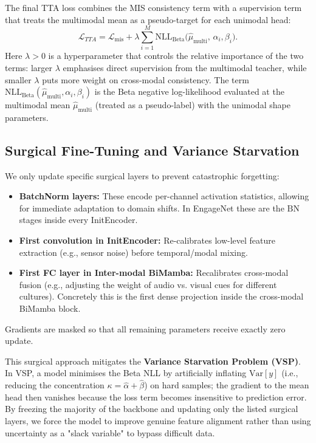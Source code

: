 \documentclass[11pt,a4paper]{article}
\begin{document}
	The final TTA loss combines the MIS consistency term with a supervision term that treats the multimodal mean as a pseudo-target for each unimodal head:
	$$
	\mathcal{L}_{TTA} = \mathcal{L}_{\text{mis}} + \lambda \sum_{i=1}^M \text{NLL}_{\text{Beta}}\bigl(\hat{\mu}_{\text{multi}},\, \alpha_i, \beta_i\bigr).
	$$
	Here $\lambda > 0$ is a hyperparameter that controls the relative importance of the two terms: larger $\lambda$ emphasises direct supervision from the multimodal teacher, while smaller $\lambda$ puts more weight on cross-modal consistency. The term $\text{NLL}_{\text{Beta}}(\hat{\mu}_{\text{multi}}, \alpha_i, \beta_i)$ is the Beta negative log-likelihood evaluated at the multimodal mean $\hat{\mu}_{\text{multi}}$ (treated as a pseudo-label) with the unimodal shape parameters.
	
	\subsection{Surgical Fine-Tuning and Variance Starvation}
	
	We only update specific surgical layers to prevent catastrophic forgetting:
	\begin{itemize}
		\item \textbf{BatchNorm layers:} These encode per-channel activation statistics, allowing for immediate adaptation to domain shifts. In EngageNet these are the $\text{BN}$ stages inside every InitEncoder.
		\item \textbf{First convolution in InitEncoder:} Re-calibrates low-level feature extraction (e.g., sensor noise) before temporal/modal mixing.
		\item \textbf{First FC layer in Inter-modal BiMamba:} Recalibrates cross-modal fusion (e.g., adjusting the weight of audio vs. visual cues for different cultures). Concretely this is the first dense projection inside the cross-modal BiMamba block.
	\end{itemize}
	Gradients are masked so that all remaining parameters receive exactly zero update.
	
	This surgical approach mitigates the \textbf{Variance Starvation Problem (VSP)}. In VSP, a model minimises the Beta NLL by artificially inflating $\mathrm{Var}[y]$ (i.e., reducing the concentration $\kappa = \hat{\alpha}+\hat{\beta}$) on hard samples; the gradient to the mean head then vanishes because the loss term becomes insensitive to prediction error. By freezing the majority of the backbone and updating only the listed surgical layers, we force the model to improve genuine feature alignment rather than using uncertainty as a "slack variable" to bypass difficult data.
	
\end{document}
